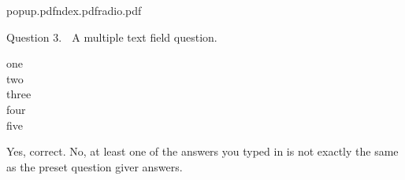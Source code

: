 \documentclass[dvips]{article}
\begin{document}
{popup.pdf}{ndex.pdf}{radio.pdf} %
{ %
    Question 3. $\;$ A multiple text field question.
    \begin{center}
    one \fieldone {} \\
    two \fieldtwo {} \\ %
    three \fieldthree {} \\
    four \fieldfour {} \\
    five \fieldfive {} %
    \end{center}
} %
{Yes, correct.} %
{No, at least one of the answers you typed in is not exactly the same
as the preset question giver answers.} %
\end{document}
